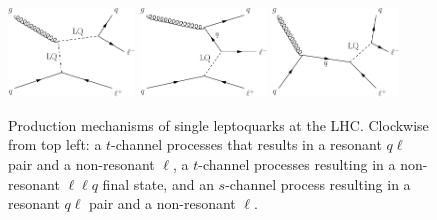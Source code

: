 \begin{figure}[H]
    \centering
    \includegraphics[width=0.3\textwidth]{Images/SingleLQProdT1.pdf}\hspace{0.1\textwidth}
    \includegraphics[width=0.3\textwidth]{Images/SingleLQProdT2.pdf}\vspace{0.05\textwidth}
    \includegraphics[width=0.3\textwidth]{Images/SingleLQProdS1.pdf}\vspace{0.05\textwidth}
    \caption{Production mechanisms of single leptoquarks at the LHC. Clockwise from top left: a $t$-channel processes that results in a resonant $q\ell$ pair and a non-resonant $\ell$, a $t$-channel processes resulting in a non-resonant $\ell\ell q$ final state, and an $s$-channel process resulting in a resonant $q\ell$ pair and a non-resonant $\ell$.}
    \label{fig:LQsingleprod}
\end{figure}

